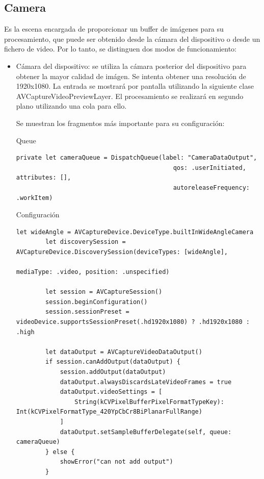 \documentclass[../main.tex]{subfiles}
\begin{document}
\subsection{Camera}

Es la escena encargada de proporcionar un buffer de imágenes para su procesamiento, que puede ser obtenido desde la cámara del dispositivo o desde un fichero de video. Por lo tanto, se distinguen dos modos de funcionamiento:

\begin{itemize}
    \item Cámara del dispositivo: se utiliza la cámara posterior del dispositivo para obtener la mayor calidad de imágen. Se intenta obtener una resolución de 1920x1080. La entrada se mostrará por pantalla utilizando la siguiente clase AVCaptureVideoPreviewLayer. El procesamiento se realizará en segundo plano utilizando una cola para ello.
    
    Se muestran los fragmentos más importante para su configuración:

    
    Queue
    \begin{lstlisting}[style=swift]
    private let cameraQueue = DispatchQueue(label: "CameraDataOutput",
                                           qos: .userInitiated, attributes: [],
                                           autoreleaseFrequency: .workItem)
    \end{lstlisting}
    
    Configuración
    \begin{lstlisting}[style=swift]
        let wideAngle = AVCaptureDevice.DeviceType.builtInWideAngleCamera
        let discoverySession = AVCaptureDevice.DiscoverySession(deviceTypes: [wideAngle],
                                                                mediaType: .video, position: .unspecified)
                                                                
        let session = AVCaptureSession()
        session.beginConfiguration()
        session.sessionPreset = videoDevice.supportsSessionPreset(.hd1920x1080) ? .hd1920x1080 : .high
        
        let dataOutput = AVCaptureVideoDataOutput()
        if session.canAddOutput(dataOutput) {
            session.addOutput(dataOutput)
            dataOutput.alwaysDiscardsLateVideoFrames = true
            dataOutput.videoSettings = [
                String(kCVPixelBufferPixelFormatTypeKey): Int(kCVPixelFormatType_420YpCbCr8BiPlanarFullRange)
            ]
            dataOutput.setSampleBufferDelegate(self, queue: cameraQueue)
        } else {
            showError("can not add output")
        }
    \end{lstlisting}
    

\end{itemize}
\end{document}
